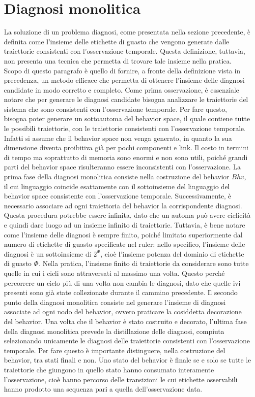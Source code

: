 \section{Diagnosi monolitica}
La soluzione di un problema diagnosi, come presentata nella sezione precedente, è definita come l'insieme delle etichette di guasto che vengono generate dalle traiettorie consistenti con l'osservazione temporale. Questa definizione, tuttavia, non presenta una tecnica che permetta di trovare tale insieme nella pratica. Scopo di questo paragrafo è quello di fornire, a fronte della definizione vista in precedenza, un metodo efficace che permetta di ottenere l'insieme delle diagnosi candidate in modo corretto e completo. 
Come prima osservazione, è essenziale notare che per generare le diagnosi candidate bisogna analizzare le traiettorie del sistema che sono consistenti con l'osservazione temporale. Per fare questo, bisogna poter generare un sottoautoma del behavior space, il quale contiene tutte le possibili traiettorie, con le traiettorie consistenti con l'osservazione temporale. Infatti si assume che il behavior space non venga generato, in quanto la sua dimensione diventa proibitiva già per pochi componenti e link. Il costo in termini di tempo ma soprattutto di memoria sono enormi e non sono utili, poiché grandi parti del behavior space risulteranno essere inconsistenti con l'osservazione.
La prima fase della diagnosi monolitica consiste nella costruzione del behavior $Bhv$, il cui linguaggio coincide esattamente con il sottoinsieme del linguaggio del behavior space consistente con l'osservazione temporale. Successivamente, è necessario associare ad ogni traiettoria del behavior la corrispondente diagnosi. Questa procedura potrebbe essere infinita, dato che un automa può avere ciclicità e quindi dare luogo ad un insieme infinito di traiettorie. Tuttavia, è bene notare come l'insieme delle diagnosi è sempre finito, poiché limitato superiormente dal numero di etichette di guasto specificate nel ruler: nello specifico, l'insieme delle diagnosi è un sottoinsieme di $2^\Phi$, cioè l'insieme potenza del dominio di etichette di guasto $\Phi$. Nella pratica, l'insieme finito di traiettorie da considerare sono tutte quelle in cui i cicli sono attraversati al massimo una volta. Questo perché percorrere un ciclo più di una volta non cambia le diagnosi, dato che quelle ivi presenti sono già state collezionate durante il cammino precedente.
Il secondo punto della diagnosi monolitica consiste nel generare l'insieme di diagnosi associate ad ogni nodo del behavior, ovvero praticare la cosiddetta decorazione del behavior.
Una volta che il behavior è stato costruito e decorato, l'ultima fase della diagnosi monolitica prevede la distillazione delle diagnosi, compiuta selezionando unicamente le diagnosi delle traiettorie consistenti con l'osservazione temporale. Per fare questo è importante distinguere, nella costruzione del behavior, tra stati finali e non. Uno stato del behavior è finale se e solo se tutte le traiettorie che giungono in quello stato hanno consumato interamente l'osservazione, cioè hanno percorso delle transizioni le cui etichette osservabili hanno prodotto una sequenza pari a quella dell'osservazione data. 

